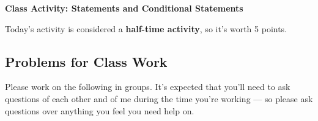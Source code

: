 \documentclass[11pt]{article}
\begin{document}
	
	\thispagestyle{empty}
	\renewcommand{\headrulewidth}{0.0pt}
	\thispagestyle{fancy}
	\lfoot{}
	\cfoot{}
	\rfoot{}	
	
	\vspace*{0in}

		\begin{center}
			\begin{large}
			\textbf{Class Activity: Statements and Conditional Statements} \\
			\end{large}
		\end{center}
		
Today's activity is considered a \textbf{half-time activity}, so it's worth 5 points. 		
		
\subsection*{Problems for Class Work}	
		
Please work on the following in groups. It's expected that you'll need to ask questions of each other and of me during the time you're working --- so please ask questions over anything you feel you need help on. 
\end{document}
